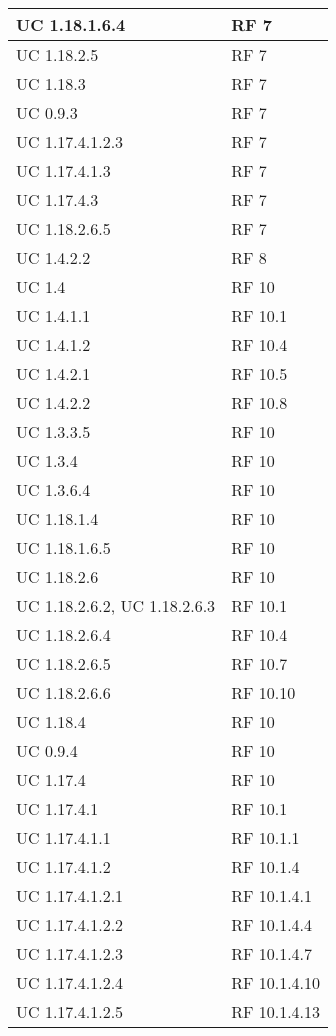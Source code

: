{\begin{longtable} [c]{| p{4cm} | p{4cm} |}
 \hline 
UC 1.18.1.6.4 & RF 7\\ 
 \hline 
UC 1.18.2.5 & RF 7\\ 
 \hline 
UC 1.18.3 & RF 7\\ 
 \hline 
UC 0.9.3 & RF 7\\ 
 \hline 
UC 1.17.4.1.2.3 & RF 7\\ 
 \hline 
UC 1.17.4.1.3 & RF 7\\ 
 \hline 
UC 1.17.4.3 & RF 7\\ 
 \hline 
UC 1.18.2.6.5 & RF 7\\ 
 \hline 
UC 1.4.2.2 & RF 8\\ 
 \hline 
UC 1.4 & RF 10\\ 
 \hline 
UC 1.4.1.1 & RF 10.1\\ 
 \hline 
UC 1.4.1.2 & RF 10.4\\ 
 \hline 
UC 1.4.2.1 & RF 10.5\\ 
 \hline 
UC 1.4.2.2 & RF 10.8\\ 
 \hline 
UC 1.3.3.5 & RF 10\\ 
 \hline 
UC 1.3.4 & RF 10\\ 
 \hline 
UC 1.3.6.4 & RF 10\\ 
 \hline 
UC 1.18.1.4 & RF 10\\ 
 \hline 
UC 1.18.1.6.5 & RF 10\\ 
 \hline 
UC 1.18.2.6 & RF 10\\ 
 \hline 
UC 1.18.2.6.2, UC 1.18.2.6.3 & RF 10.1\\ 
 \hline 
UC 1.18.2.6.4 & RF 10.4\\ 
 \hline 
UC 1.18.2.6.5 & RF 10.7\\ 
 \hline 
UC 1.18.2.6.6 & RF 10.10\\ 
 \hline 
UC 1.18.4 & RF 10\\ 
 \hline 
UC 0.9.4 & RF 10\\ 
 \hline 
UC 1.17.4 & RF 10\\ 
 \hline 
UC 1.17.4.1 & RF 10.1\\ 
 \hline 
UC 1.17.4.1.1 & RF 10.1.1\\ 
 \hline 
UC 1.17.4.1.2 & RF 10.1.4\\ 
 \hline 
UC 1.17.4.1.2.1 & RF 10.1.4.1\\ 
 \hline 
UC 1.17.4.1.2.2 & RF 10.1.4.4\\ 
 \hline 
UC 1.17.4.1.2.3 & RF 10.1.4.7\\ 
 \hline 
UC 1.17.4.1.2.4 & RF 10.1.4.10\\ 
 \hline 
UC 1.17.4.1.2.5 & RF 10.1.4.13\\ 

\end{longtable}}
